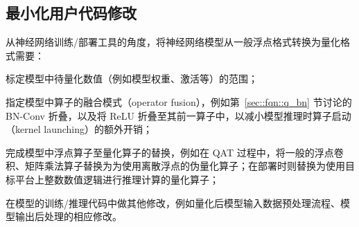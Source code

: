 \documentclass[
]{shtthesis}
\begin{document}
\subsection{最小化用户代码修改}
从神经网络训练/部署工具的角度，将神经网络模型从一般浮点格式转换为量化格式需要：
\begin{enumerate*}[a)]
  \item 标定模型中待量化数值（例如模型权重、激活等）的范围；
  \item 指定模型中算子的融合模式（operator fusion），例如第~\ref{sec::fqn::q_bn} 节讨论的 BN-Conv 折叠，以及将 ReLU 折叠至其前一算子中，以减小模型推理时算子启动（kernel launching）的额外开销；
  \item 完成模型中浮点算子至量化算子的替换，例如在 QAT 过程中，将一般的浮点卷积、矩阵乘法算子替换为为使用离散浮点的伪量化算子；在部署时则替换为使用目标平台上整数数值逻辑进行推理计算的量化算子；
  \item 在模型的训练/推理代码中做其他修改，例如量化后模型输入数据预处理流程、模型输出后处理的相应修改。
\end{enumerate*}
\end{document}
